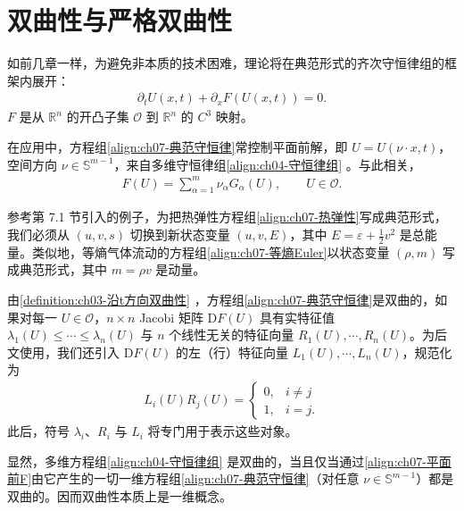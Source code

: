 \documentclass[../../main.tex]{subfiles}
\begin{document}
\section{双曲性与严格双曲性}\label{section:ch07-双曲性}

如前几章一样，为避免非本质的技术困难，理论将在典范形式的齐次守恒律组的框架内展开：
\begin{align}
\partial_t U(x,t)+\partial_x F(U(x,t))=0.
\label{align:ch07-典范守恒律}
\end{align}
$F$ 是从 $\mathbb{R}^n$ 的开凸子集 $\mathscr{O}$ 到 $\mathbb{R}^n$ 的 $C^3$ 映射。

在应用中，方程组\eqref{align:ch07-典范守恒律}常控制平面前解，即 $U=U(\nu\cdot x,t)$，空间方向 $\nu\in\mathbb{S}^{m-1}$，来自多维守恒律组\eqref{align:ch04-守恒律组}
。与此相关，
\begin{align}
F(U)=\sum_{\alpha=1}^m\nu_\alpha G_\alpha(U),\qquad U\in\mathscr{O}.
\label{align:ch07-平面前F}
\end{align}

参考第 7.1 节引入的例子，为把热弹性方程组\eqref{align:ch07-热弹性}写成典范形式，我们必须从 $(u,v,s)$ 切换到新状态变量 $(u,v,E)$，其中 $E=\varepsilon+\frac12 v^2$ 是总能量。类似地，等熵气体流动的方程组\eqref{align:ch07-等熵Euler}以状态变量 $(\rho,m)$ 写成典范形式，其中 $m=\rho v$ 是动量。

由\cref{definition:ch03-沿t方向双曲性}
，方程组\eqref{align:ch07-典范守恒律}是双曲的，如果对每一 $U\in\mathscr{O}$，$n\times n$ Jacobi 矩阵 $\mathrm{D}F(U)$ 具有实特征值 $\lambda_1(U)\leqslant\cdots\leqslant\lambda_n(U)$ 与 $n$ 个线性无关的特征向量 $R_1(U),\cdots,R_n(U)$。为后文使用，我们还引入 $\mathrm{D}F(U)$ 的左（行）特征向量 $L_1(U),\cdots,L_n(U)$，规范化为
\begin{align}
L_i(U)R_j(U)=
\begin{cases}
0,& i\neq j\\
1,& i=j.
\end{cases}
\label{align:ch07-左右向量规范化}
\end{align}
此后，符号 $\lambda_i$、$R_i$ 与 $L_i$ 将专门用于表示这些对象。

显然，多维方程组\eqref{align:ch04-守恒律组}
是双曲的，当且仅当通过\eqref{align:ch07-平面前F}由它产生的一切一维方程组\eqref{align:ch07-典范守恒律}（对任意 $\nu\in\mathbb{S}^{m-1}$）都是双曲的。因而双曲性本质上是一维概念。
\end{document}
